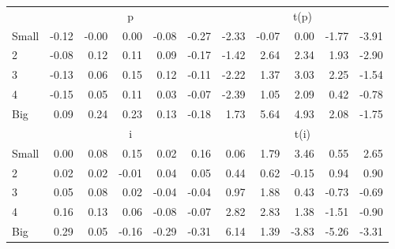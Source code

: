 \begin{table}[!ht]
\begin{tabular}{lrrrrrrrrrr}
      & \multicolumn{5}{c}{p} & \multicolumn{5}{c}{t(p)}
    
    \\
      \cmidrule(r){2-6} \cmidrule(r){7-11}

    Small   & -0.12  & -0.00  & 0.00  & -0.08  & -0.27  & -2.33  & -0.07  & 0.00  & -1.77  & -3.91  \\
         2  & -0.08  & 0.12  & 0.11  & 0.09  & -0.17  & -1.42  & 2.64  & 2.34  & 1.93  & -2.90  \\
         3  & -0.13  & 0.06  & 0.15  & 0.12  & -0.11  & -2.22  & 1.37  & 3.03  & 2.25  & -1.54  \\
         4  & -0.15  & 0.05  & 0.11  & 0.03  & -0.07  & -2.39  & 1.05  & 2.09  & 0.42  & -0.78  \\
    Big     & 0.09  & 0.24  & 0.23  & 0.13  & -0.18  & 1.73  & 5.64  & 4.93  & 2.08  & -1.75  \\

  
    
      & \multicolumn{5}{c}{i} & \multicolumn{5}{c}{t(i)}
    
    \\
      \cmidrule(r){2-6} \cmidrule(r){7-11}

    Small   & 0.00  & 0.08  & 0.15  & 0.02  & 0.16  & 0.06  & 1.79  & 3.46  & 0.55  & 2.65  \\
         2  & 0.02  & 0.02  & -0.01  & 0.04  & 0.05  & 0.44  & 0.62  & -0.15  & 0.94  & 0.90  \\
         3  & 0.05  & 0.08  & 0.02  & -0.04  & -0.04  & 0.97  & 1.88  & 0.43  & -0.73  & -0.69  \\
         4  & 0.16  & 0.13  & 0.06  & -0.08  & -0.07  & 2.82  & 2.83  & 1.38  & -1.51  & -0.90  \\
    Big     & 0.29  & 0.05  & -0.16  & -0.29  & -0.31  & 6.14  & 1.39  & -3.83  & -5.26  & -3.31  \\

  

  \bottomrule
\end{tabular}
\label{tbl:25_Size_Beta_F16}
\end{table}